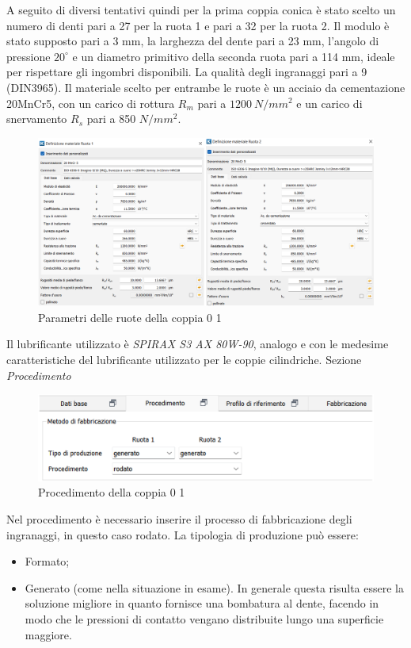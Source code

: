 A seguito di diversi tentativi quindi per la prima coppia conica è stato scelto un numero di denti pari a 27 per la ruota 1 e pari a 32 per la ruota 2. Il modulo è stato supposto pari a 3 mm, la larghezza del dente pari a 23 mm, l’angolo di pressione $20^\circ$ e un diametro primitivo della seconda ruota pari a 114 mm, ideale per rispettare gli ingombri disponibili. La qualità degli ingranaggi pari a 9 (DIN3965). Il materiale scelto per entrambe le ruote è un acciaio da cementazione 20MnCr5, con un carico di rottura $R_m$ pari a $1200\ N/mm^2$ e un carico di snervamento $R_s$ pari a 850 $N/mm^2$. 
\begin{figure}[h]
    \centering
    \includegraphics[scale=0.5]{Immagini/RuoteCoppia01.png}
    \caption{Parametri delle ruote della coppia 0 1}
    \label{fig:RuoteCoppia01}
\end{figure}

Il lubrificante utilizzato è \textit{SPIRAX S3 AX 80W-90}, analogo e con le medesime caratteristiche del lubrificante utilizzato per le coppie cilindriche. 
\newpage
Sezione \emph{Procedimento}
\begin{figure}[h]
    \centering
    \includegraphics[scale=0.6]{Immagini/ProcedimentoCoppia01.png}
    \caption{Procedimento della coppia 0 1}
    \label{fig:ProcedimentoCoppia01}
\end{figure}

Nel procedimento è necessario inserire il processo di fabbricazione degli ingranaggi, in questo caso rodato.
La tipologia di produzione può essere:
\begin{itemize}
    \item Formato;
    \item Generato (come nella situazione in esame). In generale questa risulta essere la soluzione migliore in quanto fornisce una bombatura al dente, facendo in modo che le pressioni di contatto vengano distribuite lungo una superficie maggiore. 
\end{itemize}

